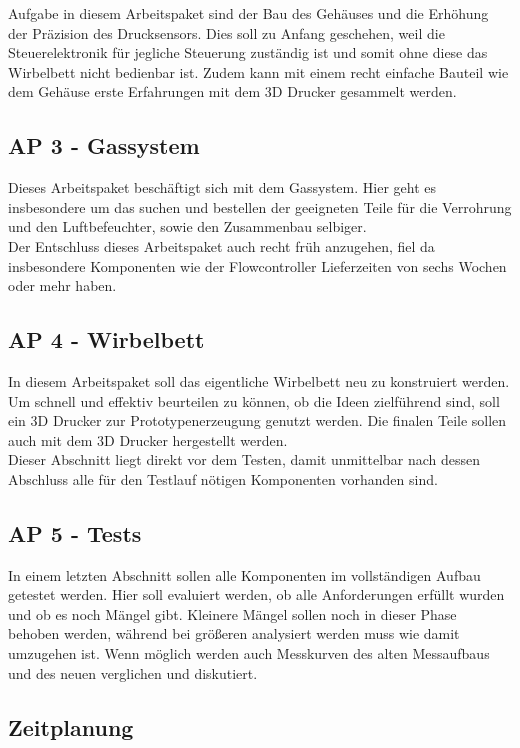 Aufgabe in diesem Arbeitspaket sind der Bau des Gehäuses und die Erhöhung der Präzision des Drucksensors. Dies soll zu Anfang geschehen, weil die Steuerelektronik für jegliche Steuerung zuständig ist und somit ohne diese das Wirbelbett nicht bedienbar ist. Zudem kann mit einem recht einfache Bauteil wie dem Gehäuse erste Erfahrungen mit dem 3D Drucker gesammelt werden.

\subsection{AP 3 - Gassystem}

Dieses Arbeitspaket beschäftigt sich mit dem Gassystem. Hier geht es insbesondere um das suchen und bestellen der geeigneten Teile für die Verrohrung und den Luftbefeuchter, sowie den Zusammenbau selbiger. \\
Der Entschluss dieses Arbeitspaket auch recht früh anzugehen, fiel da insbesondere Komponenten wie der Flowcontroller Lieferzeiten von sechs Wochen oder mehr haben. 

\subsection{AP 4 - Wirbelbett}

In diesem Arbeitspaket soll das eigentliche Wirbelbett neu zu konstruiert werden. Um schnell und effektiv beurteilen zu können, ob die Ideen zielführend sind, soll ein 3D Drucker zur Prototypenerzeugung genutzt werden. Die finalen Teile sollen auch mit dem 3D Drucker hergestellt werden. \\
Dieser Abschnitt liegt direkt vor dem Testen, damit unmittelbar nach dessen Abschluss alle für den Testlauf nötigen Komponenten vorhanden sind.


\subsection{AP 5 - Tests}

In einem letzten Abschnitt sollen alle Komponenten im vollständigen Aufbau getestet werden. Hier soll evaluiert werden, ob alle Anforderungen erfüllt wurden und ob es noch Mängel gibt. Kleinere Mängel sollen noch in dieser Phase behoben werden, während bei größeren analysiert werden muss wie damit umzugehen ist. Wenn möglich werden auch Messkurven des alten Messaufbaus und des neuen verglichen und diskutiert.


\subsection{Zeitplanung}


